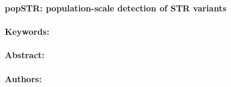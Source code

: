 \noindent
\large {\bf popSTR: population-scale detection of STR variants} 


\normalsize 


\noindent \paragraph{Keywords:} 

\noindent \paragraph{Abstract:} 



\noindent \paragraph{Authors:} 

